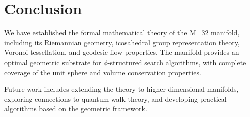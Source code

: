\documentclass{article}
\theoremstyle{remark}
\begin{document}
\section{Conclusion}

We have established the formal mathematical theory of the M_32 manifold, including its Riemannian geometry, icosahedral group representation theory, Voronoi tessellation, and geodesic flow properties. The manifold provides an optimal geometric substrate for $\phi$-structured search algorithms, with complete coverage of the unit sphere and volume conservation properties.

Future work includes extending the theory to higher-dimensional manifolds, exploring connections to quantum walk theory, and developing practical algorithms based on the geometric framework.
\end{document}
